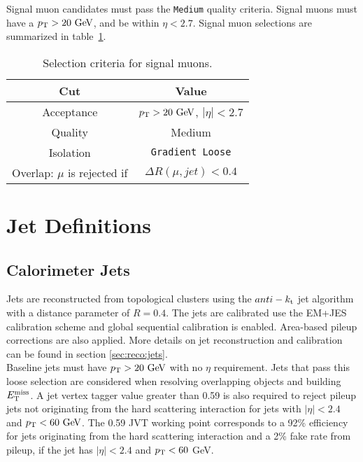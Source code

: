 \indent Signal muon candidates must pass the {\tt Medium} quality criteria.  Signal muons must have a $\pT > 20 \gev$, and be within $\eta < 2.7$.  Signal muon selections are summarized in table~\ref{tb:muons:signal}. \\  

\begin{table}[htp]
  \caption{Selection criteria for signal muons.} 
  \begin{center}
    \begin{tabular}{c|c} \hline \hline
      Cut & Value \\ \hline \hline
      Acceptance & $\pT > 20\gev$, $|\eta| < 2.7$ \\ \hline
      Quality & Medium \\ \hline
      Isolation & {\tt Gradient Loose} \\ \hline
      Overlap: $\mu$ is rejected if &  $ \Delta R(\mu,jet) < 0.4 $ \\ \hline
      \hline
    \end{tabular}
  \end{center}
  \label{tb:muons:signal}
\end{table}%

\section{Jet Definitions}
\subsection{Calorimeter Jets}
\label{sec:def:jets}

\indent Jets are reconstructed from topological clusters using the $anti-k_{\rm{t}}$ jet algorithm~\cite{antikt} with a distance parameter of $R = 0.4$.  The jets are calibrated use the EM+JES calibration scheme and global sequential calibration is enabled. Area-based pileup corrections are also applied. More details on jet reconstruction and calibration can be found in section \ref{sec:reco:jets}. \\
  
\indent Baseline jets must have $\pT > 20\gev$ with no $\eta$ requirement. Jets that pass this loose selection are considered when resolving overlapping objects and building $E_{\mathrm{T}}^{\mathrm{miss}}$.  A jet vertex tagger value greater than 0.59 is also required to reject pileup jets not originating from the hard scattering interaction for jets with $|\eta|<2.4$ and $\pt < 60 \gev$.  The 0.59 JVT working point corresponds to a 92\% efficiency for jets originating from the hard scattering interaction and a 2\% fake rate from pileup, if the jet has $|\eta|<2.4$ and $p_{\mathrm{T}}<60$ GeV. \\


